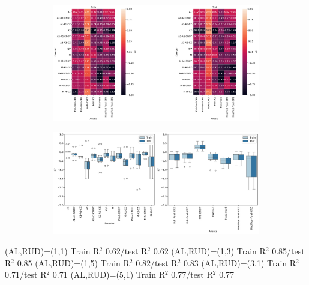 \documentclass[journal=jacsat,manuscript=article]{achemso}
\begin{document}
\begin{figure}[H]
	\centering	
	\begin{subfigure}[b]{0.49\textwidth}
		\centering
		\includegraphics[width=\linewidth]{../images/DDCC/DDCC_heatplots}
		\caption{}
		\label{fig:ddccheatplots}
	\end{subfigure}
	\hfill	
	\begin{subfigure}[b]{0.49\textwidth}
		\centering
		\includegraphics[width=\linewidth]{../images/DDCC/DDCC_boxplots}
		\caption{}
		\label{fig:ddccboxplots}
	\end{subfigure}
	\hfill
	\caption{}
	\label{fig:ddcc_all_analysis}	
\end{figure}


(AL,RUD)=(1,1) Train R$^{2}$ 0.62/test R$^{2}$ 0.62
(AL,RUD)=(1,3) Train R$^{2}$ 0.85/test R$^{2}$ 0.85
(AL,RUD)=(1,5) Train R$^{2}$ 0.82/test R$^{2}$ 0.83
(AL,RUD)=(3,1) Train R$^{2}$ 0.71/test R$^{2}$ 0.71
(AL,RUD)=(5,1) Train R$^{2}$ 0.77/test R$^{2}$ 0.77
\end{document}
